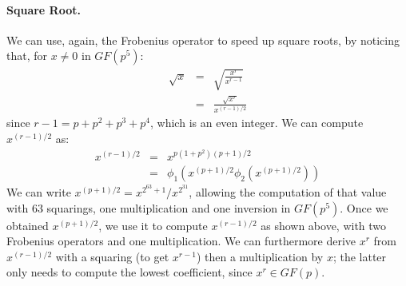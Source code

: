 \documentclass{llncs}
\newcommand{\GF}{GF}
\begin{document}
\paragraph{Square Root.} We can use, again, the Frobenius operator to
speed up square roots, by noticing that, for $x\neq 0$ in $\GF(p^5)$:
\begin{eqnarray*}
    \sqrt{x} &=& \sqrt{\frac{x^r}{x^{r-1}}} \\
             &=& \frac{\sqrt{x^r}}{x^{(r-1)/2}}
\end{eqnarray*}
since $r - 1 = p + p^2 + p^3 + p^4$, which is an even integer. We can
compute $x^{(r-1)/2}$ as:
\begin{eqnarray*}
    x^{(r-1)/2} &=& x^{p(1 + p^2)(p + 1)/2} \\
                &=& \phi_1( x^{(p+1)/2} \phi_2( x^{(p+1)/2} ))
\end{eqnarray*}
We can write $x^{(p+1)/2} = x^{2^{63} + 1} / x^{2^{31}}$, allowing the
computation of that value with 63 squarings, one multiplication and one
inversion in $\GF(p^5)$. Once we obtained $x^{(p+1)/2}$, we use it to
compute $x^{(r-1)/2}$ as shown above, with two Frobenius operators and
one multiplication. We can furthermore derive $x^r$ from $x^{(r-1)/2}$
with a squaring (to get $x^{r-1}$) then a multiplication by $x$; the
latter only needs to compute the lowest coefficient, since $x^r \in
\GF(p)$.
\end{document}
